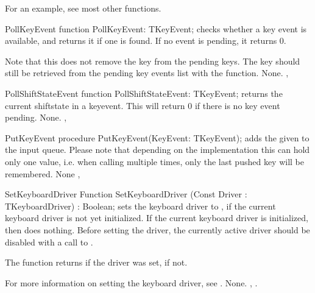 For an example, see most other functions.

\begin{function}{PollKeyEvent}
\Declaration
function PollKeyEvent: TKeyEvent;
\Description
{} checks whether a key event is available, 
and returns it if one is found. If no event is pending, 
it returns 0. 

Note that this does not remove the key from the pending keys. 
The key should still be retrieved from the pending key events 
list with the  function.
\Errors
None.
\SeeAlso
{}, 
\end{function}


\begin{function}{PollShiftStateEvent}
\Declaration
function PollShiftStateEvent: TKeyEvent;
\Description
{} returns the current shiftstate in a 
keyevent. This will return 0 if there is no key event pending.
\Errors
None.
\SeeAlso
{}, 
\end{function}


\begin{procedure}{PutKeyEvent}
\Declaration
procedure PutKeyEvent(KeyEvent: TKeyEvent);
\Description
{} adds the given  to the input 
queue. Please note that depending on the implementation this 
can hold only one value, i.e. when calling 
multiple times, only the last pushed key will be remembered.
\Errors
None
\SeeAlso
{}, 
\end{procedure}


\begin{function}{SetKeyboardDriver}
\Declaration
Function SetKeyboardDriver (Const Driver : TKeyboardDriver) : Boolean;
\Description
{} sets the keyboard driver to , if the
current keyboard driver is not yet initialized. If the current
keyboard driver is initialized, then  does 
nothing. Before setting the driver, the currently active driver should
be disabled with a call to .

The function returns  if the driver was set,  if not.

For more information on setting the keyboard driver, see .
\Errors
None.
\SeeAlso
{}, .
\end{function}

